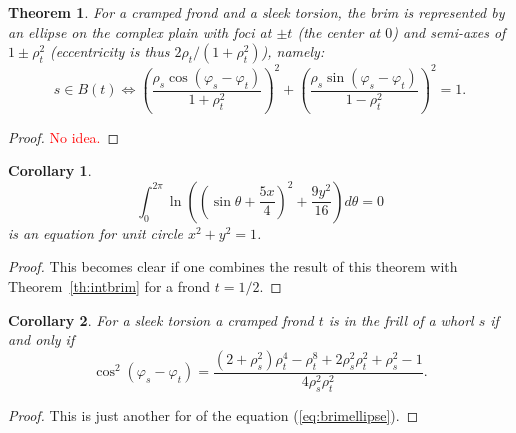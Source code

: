 \documentclass{article}
\newcommand{\be}{\begin{equation}}
\newcommand{\ee}{\end{equation}}
\newcommand{\red}[1]{\textcolor{red}{#1}}
\theoremstyle{plain}
\newtheorem{theorem}{Theorem}[section]
\newtheorem{corollary}{Corollary}[theorem]
\theoremstyle{definition}
\begin{document}
    \begin{theorem}
        For a cramped frond and a sleek torsion, the brim is represented by an ellipse on the complex plain with foci at $\pm t$ (the center at $0$) and semi-axes of $1\pm\rho_t^2$ (eccentricity is thus $2\rho_t/(1+\rho_t^2)$), namely:
        \be\label{eq:brimellipse}
            s \in B(t) \Leftrightarrow \left(\frac{\rho_s\cos(\varphi_s-\varphi_t)}{1+\rho_t^2}\right)^2 + \left(\frac{\rho_s\sin(\varphi_s-\varphi_t)}{1-\rho_t^2}\right)^2 = 1 
        .\ee
    \end{theorem}
    \begin{proof}
        \red{No idea.}
    \end{proof}

    \begin{corollary}
        $$
            \int_0^{2\pi} \ln\left(\left(\sin\theta+\frac{5x}4\right)^2+\frac{9y^2}{16}\right)d\theta = 0  
        $$ is an equation for unit circle $x^2+y^2=1$.

    \end{corollary}

    \begin{proof}
        This becomes clear if one combines the result of this theorem with Theorem~\ref{th:intbrim} for a frond $t=1/2$.  
    \end{proof}
    \begin{corollary}
        For a sleek torsion a cramped frond $t$ is in the frill of a whorl $s$ if and only if 
        $$
            \cos^2(\varphi_s-\varphi_t) = \frac{(2 + \rho_s^2)\rho_t^4 - \rho_t^8 + 2\rho_s^2\rho_t^2 + \rho_s^2 - 1}{4\rho_s^2\rho_t^2}
        .$$
    \end{corollary}

    \begin{proof}
        This is just another for of the equation (\ref{eq:brimellipse}).  
    \end{proof}
\end{document}
